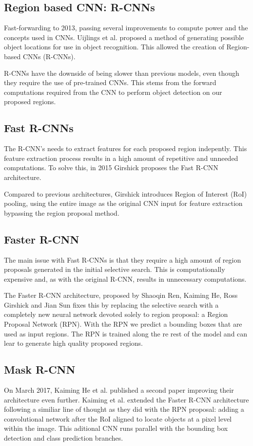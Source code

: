 \documentclass[11pt,a4paper,twocolumn,twoside]{article}
\begin{document}
\subsection{Region based CNN: R-CNNs}
Fast-forwarding to 2013, passing several improvements to compute power and the concepts used in CNNs. Uijlings et al.\cite{uijlings_van} proposed a method of generating possible object locations for use in object recognition. This allowed the creation of Region-based CNNs (R-CNNs).

R-CNNs have the downside of being slower than previous models, even though they require the use of pre-trained CNNs. This stems from the forward computations required from the CNN to perform object detection on our proposed regions. 

\subsection{Fast R-CNNs}

The R-CNN's needs to extract features for each proposed region indepently. This feature extraction process results in a high amount of repetitive and unneeded computations. To solve this, in 2015  Girshick\cite{girshick_2015} proposes the Fast R-CNN architecture. 

Compared to previous architectures, Girshick introduces Region of Interest (RoI) pooling, using the entire image as the original CNN input for feature extraction bypassing the region proposal method.

\subsection{Faster R-CNN}
The main issue with Fast R-CNNs is that they require a high amount of region proposals generated in the initial selective search. This is computationally expensive and, as with the original R-CNN, results in unnecessary computations.

The Faster R-CNN architecture, proposed by Shaoqin Ren, Kaiming He, Ross Girshick and Jian Sun\cite{ren_he_girshick_sun_2015} fixes this by replacing the selective search with a completely new neural network devoted solely to region proposal: a Region Proposal Network (RPN). With the RPN we predict a bounding boxes that are used as input regions. The RPN is trained along the re rest of the model and can lear to generate high quality proposed regions.

\subsection{Mask R-CNN}
On March 2017, Kaiming He et al.\cite{he_gkioxari_dollár_girshick_2017} published a second paper improving their architecture even further. Kaiming et al. extended the Faster R-CNN architecture following a similiar line of thought as they did with the RPN proposal: adding a convolutional network after the RoI aligned to locate objects at a pixel level within the image. This aditional CNN runs parallel with the bounding box detection and class prediction branches.
\end{document}
